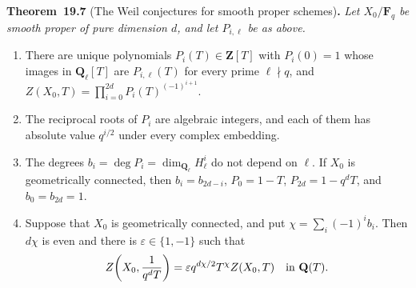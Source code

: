 \documentclass[11pt]{article}
\newenvironment{bpstatement}[2]{\par\addvspace{0.6\baselineskip}\noindent\textbf{#1}#2\textbf{.}\enspace\ignorespaces}
  {\par\addvspace{0.4\baselineskip}}
\newenvironment{bpstatementit}[2]{\begin{bpstatement}{#1}{#2}\itshape\ignorespaces}{\end{bpstatement}}
\begin{document}
\label{bp342}%
\begin{bpstatementit}{Theorem~19.7}{ (The Weil conjectures for smooth proper schemes)}
Let \(X_0/\mathbf F_q\) be smooth proper of pure dimension \(d\), and let \(P_{i,\ell}\) be as above.

\begin{enumerate}
\item There are unique polynomials \(P_i(T)\in\mathbf Z[T]\) with \(P_i(0)=1\) whose images in \(\mathbf Q_\ell[T]\) are \(P_{i,\ell}(T)\) for every prime \(\ell\nmid q\), and \(Z(X_0,T)=\prod_{i=0}^{2d}P_i(T)^{(-1)^{i+1}}\).
\item The reciprocal roots of \(P_i\) are algebraic integers, and each of them has absolute value \(q^{i/2}\) under every complex embedding.
\item The degrees \(b_i=\deg P_i=\dim_{\mathbf Q_\ell}H^i_\ell\) do not depend on \(\ell\). If \(X_0\) is geometrically connected, then \(b_i=b_{2d-i}\), \(P_0=1-T\), \(P_{2d}=1-q^dT\), and \(b_0=b_{2d}=1\).
\item Suppose that \(X_0\) is geometrically connected, and put \(\chi=\sum_i(-1)^ib_i\). Then \(d\chi\) is even and there is \(\varepsilon\in\{1,-1\}\) such that \[
   Z\!\left(X_0,\frac1{q^dT}\right)
   =\varepsilon q^{d\chi/2}T^\chi Z(X_0,T)
   \quad\hbox{in }\mathbf Q(T).
   \]
\end{enumerate}
\end{bpstatementit}
\end{document}
